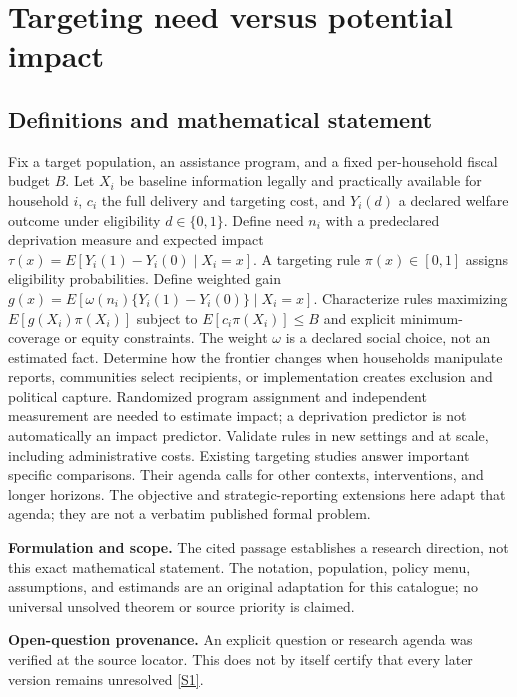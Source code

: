 \documentclass[11pt]{article}
\newcommand{\sref}[2]{\hyperlink{source:#1:#2}{[S#2]}}
\begin{document}
\section*{Targeting need versus potential impact}\label{30007656}
\subsection{Definitions and mathematical statement}
Fix a target population, an assistance program, and a fixed per-household fiscal budget \(B\). Let \(X_i\) be baseline information legally and practically available for household \(i\), \(c_i\) the full delivery and targeting cost, and \(Y_i(d)\) a declared welfare outcome under eligibility \(d\in\{0,1\}\). Define need \(n_i\) with a predeclared deprivation measure and expected impact \(\tau(x)=E[Y_i(1)-Y_i(0)\mid X_i=x]\). A targeting rule \(\pi(x)\in[0,1]\) assigns eligibility probabilities. Define weighted gain \(g(x)=E[\omega(n_i)\{Y_i(1)-Y_i(0)\}\mid X_i=x]\). Characterize rules maximizing \(E[g(X_i)\pi(X_i)]\) subject to \(E[c_i\pi(X_i)]\le B\) and explicit minimum-coverage or equity constraints. The weight \(\omega\) is a declared social choice, not an estimated fact. Determine how the frontier changes when households manipulate reports, communities select recipients, or implementation creates exclusion and political capture. Randomized program assignment and independent measurement are needed to estimate impact; a deprivation predictor is not automatically an impact predictor. Validate rules in new settings and at scale, including administrative costs. Existing targeting studies answer important specific comparisons. Their agenda calls for other contexts, interventions, and longer horizons. The objective and strategic-reporting extensions here adapt that agenda; they are not a verbatim published formal problem.

\par\textbf{Formulation and scope.} The cited passage establishes a research direction, not this exact mathematical statement. The notation, population, policy menu, assumptions, and estimands are an original adaptation for this catalogue; no universal unsolved theorem or source priority is claimed.

\par\textbf{Open-question provenance.} An explicit question or research agenda was verified at the source locator. This does not by itself certify that every later version remains unresolved \sref{30007656}{1}.
\end{document}
